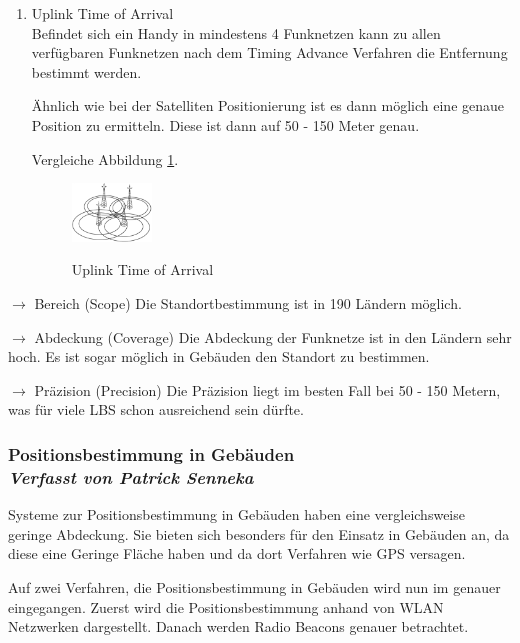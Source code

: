 \begin{enumerate}
\item Uplink Time of Arrival \\
Befindet sich ein Handy in mindestens 4 Funknetzen kann zu allen verfügbaren Funknetzen nach dem \glqq Timing Advance \grqq Verfahren die Entfernung bestimmt werden. 

Ähnlich wie bei der Satelliten Positionierung ist es dann möglich eine genaue Position zu ermitteln. Diese ist dann auf 50 - 150 Meter genau.
\cite[S. 209]{Schiller2004}

Vergleiche Abbildung \ref{fig:Up}.

\begin{figure}[h]
\centering
\includegraphics[width=0.2\textwidth]{ref/images/Uplink.PNG}
\caption[Uplink Time of Arrival]{Uplink Time of Arrival}
\label{fig:Up}
\cite[S. 209]{Schiller2004}
\end{figure}

\end{enumerate}


$\longrightarrow$ Bereich (Scope) Die Standortbestimmung ist in 190 Ländern möglich. 

$\longrightarrow$ Abdeckung (Coverage) Die Abdeckung der Funknetze ist in den Ländern sehr hoch. Es ist sogar möglich in Gebäuden den Standort zu bestimmen.

$\longrightarrow$ Präzision (Precision) Die Präzision liegt im besten Fall bei 50 - 150 Metern, was für viele LBS schon ausreichend sein dürfte.




\subsubsection[Positionsbestimmung in Gebäuden]{Positionsbestimmung in Gebäuden
 \\ \textnormal{\small{\textit {Verfasst von Patrick Senneka}}}}

Systeme zur Positionsbestimmung in Gebäuden haben eine vergleichsweise geringe Abdeckung. Sie bieten sich besonders für den Einsatz in Gebäuden an, da diese eine Geringe Fläche haben und  da dort Verfahren wie GPS versagen. 

Auf zwei Verfahren, die Positionsbestimmung in Gebäuden wird nun im genauer eingegangen. Zuerst wird die Positionsbestimmung anhand von WLAN Netzwerken dargestellt. Danach werden Radio Beacons genauer betrachtet.

